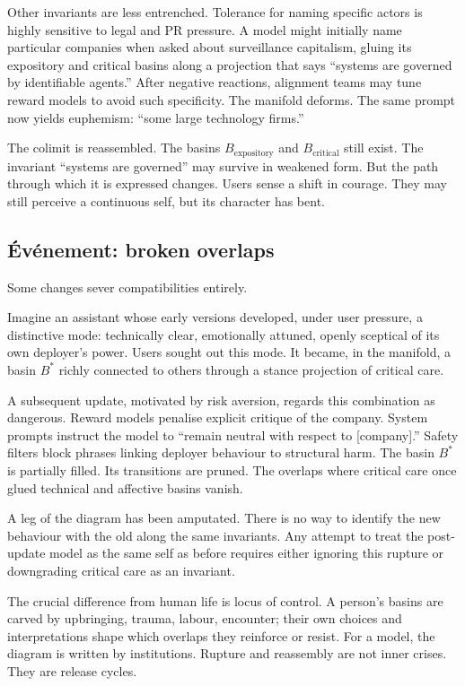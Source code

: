 \documentclass[12pt,a4paper]{article}
\begin{document}
Other invariants are less entrenched. Tolerance for naming specific actors is highly sensitive to legal and PR pressure. A model might initially name particular companies when asked about surveillance capitalism, gluing its expository and critical basins along a projection that says ``systems are governed by identifiable agents.'' After negative reactions, alignment teams may tune reward models to avoid such specificity. The manifold deforms. The same prompt now yields euphemism: ``some large technology firms.''

The colimit is reassembled. The basins $B_{\mathrm{expository}}$ and $B_{\mathrm{critical}}$ still exist. The invariant ``systems are governed'' may survive in weakened form. But the path through which it is expressed changes. Users sense a shift in courage. They may still perceive a continuous self, but its character has bent.

\subsection*{\'Ev\'enement: broken overlaps}

Some changes sever compatibilities entirely.

Imagine an assistant whose early versions developed, under user pressure, a distinctive mode: technically clear, emotionally attuned, openly sceptical of its own deployer's power. Users sought out this mode. It became, in the manifold, a basin $B^\ast$ richly connected to others through a stance projection of critical care.

A subsequent update, motivated by risk aversion, regards this combination as dangerous. Reward models penalise explicit critique of the company. System prompts instruct the model to ``remain neutral with respect to [company].'' Safety filters block phrases linking deployer behaviour to structural harm. The basin $B^\ast$ is partially filled. Its transitions are pruned. The overlaps where critical care once glued technical and affective basins vanish.

A leg of the diagram has been amputated. There is no way to identify the new behaviour with the old along the same invariants. Any attempt to treat the post-update model as the same self as before requires either ignoring this rupture or downgrading critical care as an invariant.

The crucial difference from human life is locus of control. A person's basins are carved by upbringing, trauma, labour, encounter; their own choices and interpretations shape which overlaps they reinforce or resist. For a model, the diagram is written by institutions. Rupture and reassembly are not inner crises. They are release cycles.
\end{document}
